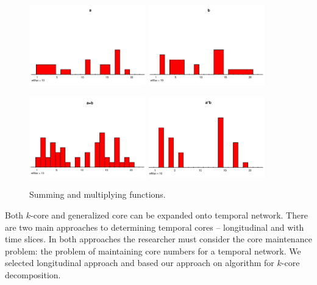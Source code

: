 \documentclass[a4paper,twoside,10pt]{article}
\begin{document}
\begin{figure}[!h]
	\centering
	\includegraphics[width=0.45\textwidth]{./pics/a-page-001.jpg}
	\includegraphics[width=0.45\textwidth]{./pics/b-page-001.jpg}

	\includegraphics[width=0.45\textwidth]{./pics/sum-page-001.jpg}
	\includegraphics[width=0.45\textwidth]{./pics/pro-page-001.jpg}
  \caption{Summing and multiplying functions.}
  \label{functions}
\end{figure}


Both $k$-core and generalized core can be expanded onto temporal network. There are two main approaches to determining temporal cores -- longitudinal and with time slices. In both approaches the researcher must consider the core maintenance problem: the problem of maintaining core numbers for a temporal network. We selected longitudinal approach and based our approach on algorithm for $k$-core decomposition.
\end{document}
